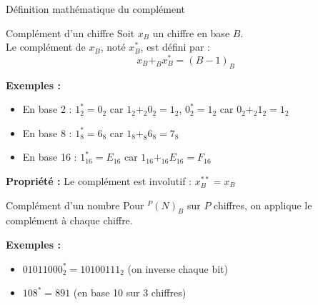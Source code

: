 \documentclass[aspectratio=1610]{beamer}
\begin{document}
\begin{frame}[allowframebreaks]{Définition mathématique du complément}

  \begin{block}{Complément d'un chiffre}
    Soit $x_B$ un chiffre en base $B$. \\
    Le complément de $x_B$, noté $x^*_B$, est défini par :
    \[
      x_B +_B x^*_B = (B-1)_B
    \]
  \end{block}

  \textbf{Exemples :}
  \begin{itemize}
    \item En base 2 : $1^*_2 = 0_2$ car $1_2 +_2 0_2 = 1_2$, \quad $0^*_2 = 1_2$ car $0_2 +_2 1_2 = 1_2$
    \item En base 8 : $1^*_8 = 6_8$ car $1_8 +_8 6_8 = 7_8$
    \item En base 16 : $1^*_{16} = E_{16}$ car $1_{16} +_{16} E_{16} = F_{16}$
  \end{itemize}

  \textbf{Propriété :} Le complément est involutif : $x^{**}_B = x_B$

  \vspace{0.5em}

  \begin{block}{Complément d'un nombre}
    Pour $^P(N)_B$ sur $P$ chiffres, on applique le complément à chaque chiffre.
  \end{block}

  \textbf{Exemples :}
  \begin{itemize}
    \item $01011000_2^* = 10100111_2$ (on inverse chaque bit)
    \item $108^* = 891$ (en base 10 sur 3 chiffres)
  \end{itemize}

\end{frame}
\end{document}
